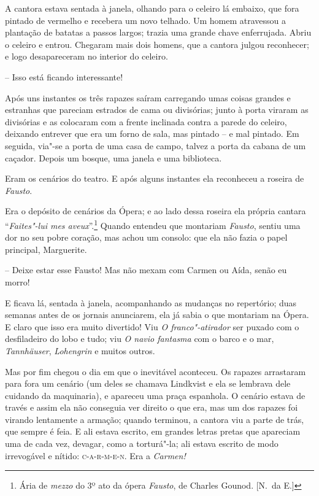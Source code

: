 A cantora estava sentada à janela, olhando para o celeiro lá embaixo,
que fora pintado de vermelho e recebera um novo telhado. Um homem
atravessou a plantação de batatas a passos largos; trazia uma grande
chave enferrujada. Abriu o celeiro e entrou. Chegaram mais dois homens,
que a cantora julgou reconhecer; e logo desapareceram no interior do
celeiro.

-- Isso está ficando interessante!

Após uns instantes os três rapazes saíram carregando umas coisas grandes
e estranhas que pareciam estrados de cama ou divisórias; junto à porta
viraram as divisórias e as colocaram com a frente inclinada contra a
parede do celeiro, deixando entrever que era um forno de sala, mas
pintado -- e mal pintado. Em seguida, via"-se a porta de uma casa de
campo, talvez a porta da cabana de um caçador. Depois um bosque, uma
janela e uma biblioteca.

 Eram os cenários do teatro. E após alguns instantes ela reconheceu a
roseira de \textit{Fausto}.

Era o depósito de cenários da Ópera; e ao lado dessa roseira ela própria
cantara ``\textit{Faites"-lui mes aveux}''.\footnote{ Ária de \textit{mezzo} do
3º ato da ópera \textit{Fausto}, de Charles Gounod. [N.~da E.]} Quando
entendeu que montariam \textit{Fausto}, sentiu uma dor no seu pobre
coração, mas achou um consolo: que ela não fazia o papel principal,
Marguerite.

-- Deixe estar esse Fausto! Mas não mexam com Carmen ou Aída, senão eu
morro!

E ficava lá, sentada à janela, acompanhando as mudanças no repertório;
duas semanas antes de os jornais anunciarem, ela já sabia o que
montariam na Ópera. E claro que isso era muito divertido! Viu \textit{O
franco"-atirador} ser puxado com o desfiladeiro do lobo e tudo; viu
\textit{O navio fantasma} com o barco e o mar, \textit{Tannhäuser},
\textit{Lohengrin} e muitos outros.

 Mas por fim chegou o dia em que o inevitável aconteceu. Os rapazes
arrastaram para fora um cenário (um deles se chamava Lindkvist e ela se
lembrava dele cuidando da maquinaria), e apareceu uma praça espanhola.
O cenário estava de través e assim ela não conseguia ver direito o que
era, mas um dos rapazes foi virando lentamente a armação; quando
terminou, a cantora viu a parte de trás, que sempre é feia. E ali
estava escrito, em grandes letras pretas que apareciam uma de cada vez,
devagar, como a torturá"-la; ali estava escrito de modo irrevogável e
nítido: \textsc{c}-\textsc{a}-\textsc{r}-\textsc{m}-\textsc{e}-\textsc{n}. 
Era a \textit{Carmen!}

